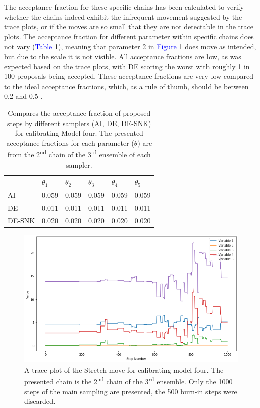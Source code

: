 The acceptance fraction for these specific chains has been calculated to verify whether the chains indeed exhibit the infrequent movement suggested by the trace plots, or if the moves are so small that they are not detectable in the trace plots. The acceptance fraction for different parameter within specific chains does not vary (\hyperref[tab_logbook_1.1_acceptance_frac]{\textcolor{blue}{Table }\ref{tab_logbook_1.1_acceptance_frac}}), meaning that parameter 2 in \hyperref[fig_logbook_1.1_trace_plot_Stretch]{\textcolor{blue}{Figure }\ref{fig_logbook_1.1_trace_plot_Stretch}} does move as intended, but due to the scale it is not visible. All acceptance fractions are low, as was expected based on the trace plots, with DE scoring the worst with roughly 1 in 100 proposals being accepted. These acceptance fractions are very low compared to the ideal acceptance fractions, which, as a rule of thumb, should be between 0.2 and 0.5 \citep{foreman2013emcee}. 

\begin{table}[ht]
\centering
\caption{Compares the acceptance fraction of proposed steps by different samplers (AI, DE, DE-SNK)  for calibrating Model four. The presented acceptance fractions for each parameter ($\theta$) are from the 2\textsuperscript{nd} chain of the 3\textsuperscript{rd} ensemble of each sampler.}
\label{tab_logbook_1.1_acceptance_frac}
\begin{tabularx}{\linewidth}{XXXXXX}
\toprule
 & \(\theta_1\) & \(\theta_2\) & \(\theta_3\) & \(\theta_4\) & \(\theta_5\) \\
\midrule
AI & 0.059 & 0.059 & 0.059 & 0.059 & 0.059 \\
DE & 0.011 & 0.011 & 0.011 & 0.011 & 0.011 \\
DE-SNK & 0.020 & 0.020 & 0.020 & 0.020 & 0.020 \\
\bottomrule
\end{tabularx}
\centering
\end{table}

\begin{figure}[hbt]
\centering
\includegraphics[width=0.9\linewidth]{Figures/appendix_figs/C.1.1 trace plot Stretch.png}
\caption{A trace plot of the Stretch move for calibrating model four. The presented chain is the 2\textsuperscript{nd} chain of the 3\textsuperscript{rd}  ensemble. Only the 1000 steps of the main sampling are presented, the 500 burn-in steps were discarded. }\label{fig_logbook_1.1_trace_plot_Stretch}
\end{figure}

